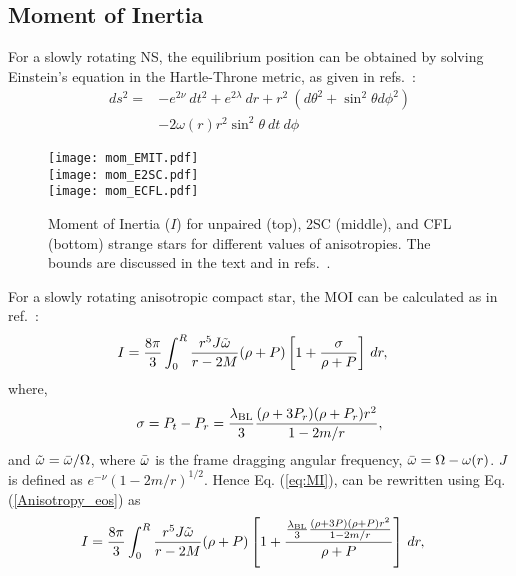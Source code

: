 \documentclass[%
reprint,
superscriptaddress,
nofootinbib,
amsmath,
amssymb,
aps,
floatfix,
showkeys,
]{revtex4-2}
\begin{document}
\subsection{Moment of Inertia}
\label{moi}
For a slowly rotating NS, the equilibrium position can be obtained by solving Einstein's equation in the Hartle-Throne metric, as given in refs.~\cite{Hartle_1967, Hartle_1968, Hartle_1973}:
\begin{align}
    ds^2  = & -e^{2\nu} \ dt^2 + e^{2\lambda} \ dr + r^2 \ (d\theta^2 +\sin^2\theta d\phi^2)
    \\ \nonumber
    & - 2\omega(r)r^2\sin^2\theta \ dt \ d\phi
\end{align}
\begin{figure}
    \centering
    \texttt{[image: mom\_EMIT.pdf]} \\
     \texttt{[image: mom\_E2SC.pdf]} \\
       \texttt{[image: mom\_ECFL.pdf]}
    \caption{Moment of Inertia ($I$) for unpaired (top), 2SC (middle), and  CFL (bottom) strange stars for different values of anisotropies. The bounds are discussed in the text and in refs.~\cite{Landry_2018, Kumar_2019}.}
    \label{MOI}
\end{figure}
For a slowly rotating anisotropic compact star, the MOI can be  calculated as in ref.~\cite{Sulaksono_2020}:
\begin{align}
    I &= \frac{8\pi}{3}\int_0^R \frac{r^5J\Tilde{\omega}}{r- 2M}(\rho+P)\left[1+\frac{\sigma}{\rho+P}\right] \, dr,
    \label{eq:MI}
\end{align}
where,
\begin{eqnarray}
 \sigma = P_t - P_r = \frac{\lambda_{\rm BL}}{3} \frac{(\rho+3P_r)(\rho + P_r)r^2}{1-2m/r}, \label{sigmapp} 
\end{eqnarray}
and $\Tilde{\omega}=\Bar{\omega}/\Omega$, where $\Bar{\omega}$ is the frame dragging angular frequency, $\Bar{\omega} = \Omega-\omega(r)$. $J$ is defined as $e^{-\nu}(1-2m/r)^{1/2}$.  Hence Eq. (\ref{eq:MI}), can be rewritten using Eq. (\ref{Anisotropy_eos}) as
\begin{align}
    I &= \frac{8\pi}{3}\int_0^R \frac{r^5J\Tilde{\omega}}{r- 2M}(\rho+P)\left[1+\frac{\frac{\lambda_{\rm BL}}{3} \frac{(\rho+3P)(\rho + P)r^2}{1-2m/r}}{\rho+P}\right] \, dr,
\end{align}
\end{document}
